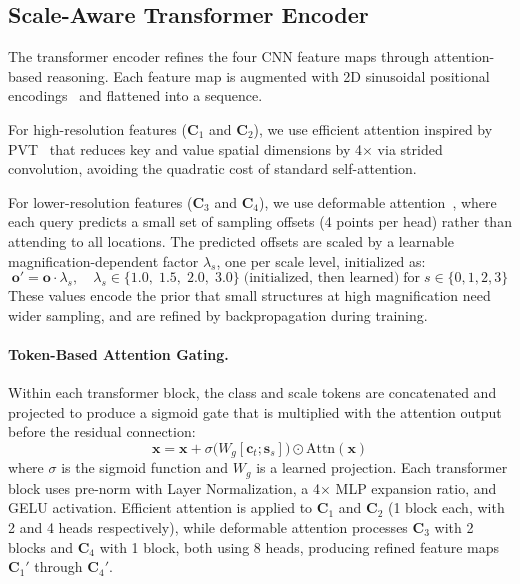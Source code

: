 \documentclass[runningheads]{llncs}
\begin{document}
\subsection{Scale-Aware Transformer Encoder}
\label{sec:transformer}

The transformer encoder refines the four CNN feature maps through attention-based reasoning. Each feature map is augmented with 2D sinusoidal positional encodings~\cite{vaswani2017attention} and flattened into a sequence.

For high-resolution features ($\mathbf{C}_1$ and $\mathbf{C}_2$), we use efficient attention inspired by PVT~\cite{wang2021pvt} that reduces key and value spatial dimensions by 4$\times$ via strided convolution, avoiding the quadratic cost of standard self-attention.

For lower-resolution features ($\mathbf{C}_3$ and $\mathbf{C}_4$), we use deformable attention~\cite{zhu2020deformable}, where each query predicts a small set of sampling offsets (4 points per head) rather than attending to all locations. The predicted offsets are scaled by a learnable magnification-dependent factor $\lambda_s$, one per scale level, initialized as:
\begin{equation}
    \mathbf{o}' = \mathbf{o} \cdot \lambda_s, \quad \lambda_s \in \{1.0,\; 1.5,\; 2.0,\; 3.0\} \; \text{(initialized, then learned)} \; \text{for} \; s \in \{0, 1, 2, 3\}
\end{equation}
These values encode the prior that small structures at high magnification need wider sampling, and are refined by backpropagation during training.

\paragraph{Token-Based Attention Gating.}
Within each transformer block, the class and scale tokens are concatenated and projected to produce a sigmoid gate that is multiplied with the attention output before the residual connection:
\begin{equation}
    \mathbf{x} = \mathbf{x} + \sigma\big(W_g[\mathbf{c}_t ; \mathbf{s}_s]\big) \odot \text{Attn}(\mathbf{x})
\end{equation}
where $\sigma$ is the sigmoid function and $W_g$ is a learned projection. Each transformer block uses pre-norm with Layer Normalization, a 4$\times$ MLP expansion ratio, and GELU activation. Efficient attention is applied to $\mathbf{C}_1$ and $\mathbf{C}_2$ (1 block each, with 2 and 4 heads respectively), while deformable attention processes $\mathbf{C}_3$ with 2 blocks and $\mathbf{C}_4$ with 1 block, both using 8 heads, producing refined feature maps $\mathbf{C}_1'$ through $\mathbf{C}_4'$.
\end{document}
